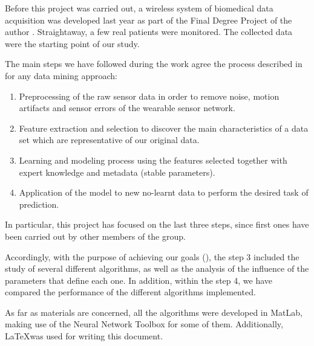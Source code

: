 \label{chapter:methodology}

Before this project was carried out, a wireless system of biomedical data acquisition was developed last year as part of the Final Degree Project of the author \cite{Irene:PFC:2014}. Straightaway, a few real patients were monitored. The collected data were the starting point of our study.

The main steps we have followed during the work agree the process described in \cite{banaee2013data} for any data mining approach:

\begin{enumerate}
	\item Preprocessing of the raw sensor data in order to remove noise, motion artifacts and sensor errors of the wearable sensor network.

	\item Feature extraction and selection to discover the main characteristics of a data set which are representative of our original data.

	\item Learning and modeling process using the features selected together with expert knowledge and metadata (stable parameters).

	\item Application of the model to new no-learnt data to perform the desired task of prediction.

\end{enumerate}

In particular, this project has focused on the last three steps, since first ones have been carried out by other members of the group. 

Accordingly, with the purpose of achieving our goals (), the step 3 included the study of several different algorithms, as well as the analysis of the influence of the parameters that define each one. In addition, within the step 4, we have compared the performance of the different algorithms implemented.

As far as materials are concerned, all the algorithms were developed in MatLab, making use of the Neural Network Toolbox for some of them. Additionally, \LaTeX was used for writing this document. 